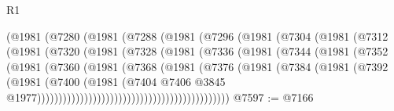 \begin{lexlean}{R1}
\begin{coremodule}
                          (@1981
                            (@7280
                              (@1981
                                (@7288
                                  (@1981
                                    (@7296
                                      (@1981
                                        (@7304
                                          (@1981
                                            (@7312
                                              (@1981
                                                (@7320
                                                  (@1981
                                                    (@7328
                                                      (@1981
                                                        (@7336
                                                          (@1981
                                                            (@7344
                                                              (@1981
                                                                (@7352
                                                                  (@1981
                                                                    (@7360
                                                                      (@1981
                                                                        (@7368
                                                                          (@1981
                                                                            (@7376
                                                                              (@1981
                                                                                (@7384
                                                                                  (@1981
                                                                                    (@7392
                                                                                      (@1981
                                                                                        (@7400
                                                                                          (@1981
                                                                                            (@7404
                                                                                              @7406
                                                                                              @3845
                                                                                              @1977)))))))))))))))))))))))))))))))))))))))))))))
@7597 := @7166

\end{coremodule}
\end{lexlean}
